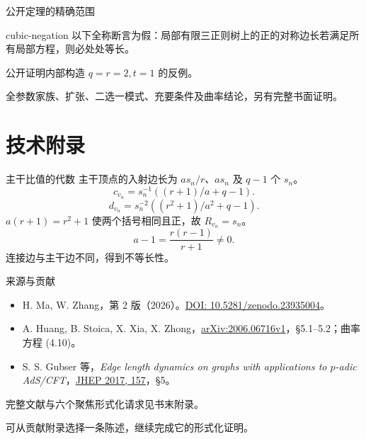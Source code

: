 \documentclass{beamer}
\begin{document}
\begin{frame}{公开定理的精确范围}
\small
\begin{bookresult}{cubic-negation}
以下全称断言为假：局部有限三正则树上的正的对称边长若满足所有局部方程，则必处处等长。
\end{bookresult}
公开证明内部构造 $q=r=2,t=1$ 的反例。

全参数家族、扩张、二选一模式、充要条件及曲率结论，另有完整书面证明。
\end{frame}
\appendix
\section{技术附录}
\begin{frame}{主干比值的代数}
\small
主干顶点的入射边长为 $as_n/r$、$as_n$ 及 $q-1$ 个 $s_n$。
\[
c_{v_n}=s_n^{-1}((r+1)/a+q-1).
\]
\[
d_{v_n}=s_n^{-2}((r^2+1)/a^2+q-1).
\]
$a(r+1)=r^2+1$ 使两个括号相同且正，故 $R_{v_n}=s_n$。
\[
a-1=\frac{r(r-1)}{r+1}\ne0.
\]
连接边与主干边不同，得到不等长性。
\end{frame}
\begin{frame}{来源与贡献}
\footnotesize
\begin{itemize}
\item H. Ma, W. Zhang，第 2 版（2026）。\href{https://doi.org/10.5281/zenodo.23935004}{DOI: 10.5281/zenodo.23935004}。
\item A. Huang, B. Stoica, X. Xia, X. Zhong，\href{https://arxiv.org/abs/2006.06716v1}{arXiv:2006.06716v1}，§5.1--5.2；曲率方程 (4.10)。
\item S. S. Gubser 等，\emph{Edge length dynamics on graphs with applications to $p$-adic AdS/CFT}，\href{https://doi.org/10.1007/JHEP06(2017)157}{JHEP 2017, 157}，§5。
\end{itemize}
完整文献与六个聚焦形式化请求见书末附录。

可从贡献附录选择一条陈述，继续完成它的形式化证明。
\end{frame}
\FormalVerification
\end{document}

